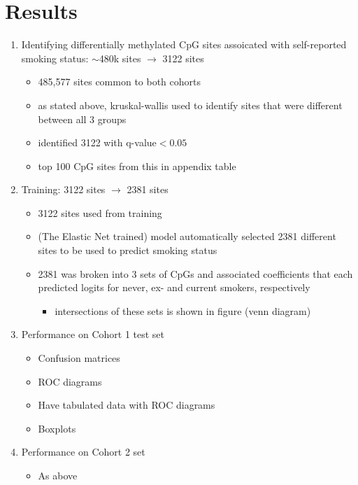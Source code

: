 \documentclass{article}
\begin{document}
\section{Results} \label{sec:results}
\begin{enumerate}
    \item Identifying differentially methylated CpG sites assoicated with self-reported smoking status: \(\sim\)480k sites \(\rightarrow\) 3122 sites
    \begin{itemize}
        \item 485,577 sites common to both cohorts 
        \item as stated above, kruskal-wallis used to identify sites that were different between all 3 groups
        \item identified 3122 with q-value\(< 0.05\)
        \item top 100 CpG sites from this in appendix table 
    \end{itemize}
    \item Training: 3122 sites \(\rightarrow\) 2381 sites
    \begin{itemize}
        \item 3122 sites used from training
        \item (The Elastic Net trained) model automatically selected 2381 different sites to be used to predict smoking status
        \item 2381 was broken into 3 sets of CpGs and associated coefficients that each predicted logits for never, ex- and current smokers, respectively
        \begin{itemize}
            \item intersections of these sets is shown in figure (venn diagram)
        \end{itemize}
    \end{itemize}
    \item Performance on Cohort 1 test set
    \begin{itemize}
        \item Confusion matrices
        \item ROC diagrams
        \item Have tabulated data with ROC diagrams
        \item Boxplots
    \end{itemize}
    \item Performance on Cohort 2 set
    \begin{itemize}
        \item As above

\end{itemize}
\end{enumerate}
\end{document}
